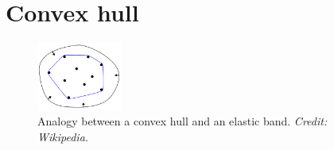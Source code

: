 \documentclass{article}
\begin{document}

\section{Convex hull}

\begin{figure}
  \vspace{-40pt}
  \begin{center}
    \includegraphics[width=0.25\textwidth]{ConvexHull.png}
  \end{center}
  \vspace{-10pt}
  \caption{Analogy between a convex hull and an elastic band. \textit{Credit: Wikipedia.}}
  \vspace{-20pt}
\end{figure}
\end{document}
